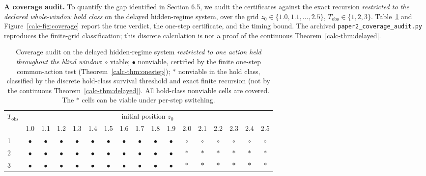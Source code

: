\documentclass[10pt,twocolumn]{article}
\theoremstyle{definition}
\begin{document}
\textbf{A coverage audit.} To quantify the gap identified in Section 6.5, we audit the certificates against the exact recursion \emph{restricted to the declared whole-window hold class} on the delayed hidden-regime system, over the grid \(z_{0} \in \{1.0, 1.1, \dots, 2.5\}\), \(T_{\mathrm{obs}} \in \{1,2,3\}\). Table~\ref{calc-tab:coverage} and Figure~\ref{calc-fig:coverage} report the true verdict, the one-step certificate, and the timing bound. The archived \texttt{paper2\_coverage\_audit.py} reproduces the
finite-grid classification; this discrete calculation is not a proof of
the continuous Theorem~\ref{calc-thm:delayed}.

\begin{table}[t]
\centering
\footnotesize
\begin{tabular}{@{}lcccccccccccccccc@{}}
\toprule
\(T_{\mathrm{obs}}\) & \multicolumn{16}{c}{initial position \(z_{0}\)} \\
\cmidrule(lr){2-17}
 & 1.0 & 1.1 & 1.2 & 1.3 & 1.4 & 1.5 & 1.6 & 1.7 & 1.8 & 1.9 & 2.0 & 2.1 & 2.2 & 2.3 & 2.4 & 2.5 \\
\midrule
1 & \(\bullet\) & \(\bullet\) & \(\bullet\) & \(\bullet\) & \(\bullet\) & \(\bullet\) & \(\bullet\) & \(\bullet\) & \(\bullet\) & \(\bullet\) & \(\circ\) & \(\circ\) & \(\circ\) & \(\circ\) & \(\circ\) & \(\circ\) \\
2 & \(\bullet\) & \(\bullet\) & \(\bullet\) & \(\bullet\) & \(\bullet\) & \(\bullet\) & \(\bullet\) & \(\bullet\) & \(\bullet\) & \(\bullet\) & \(\ast\) & \(\ast\) & \(\ast\) & \(\ast\) & \(\ast\) & \(\ast\) \\
3 & \(\bullet\) & \(\bullet\) & \(\bullet\) & \(\bullet\) & \(\bullet\) & \(\bullet\) & \(\bullet\) & \(\bullet\) & \(\bullet\) & \(\bullet\) & \(\ast\) & \(\ast\) & \(\ast\) & \(\ast\) & \(\ast\) & \(\ast\) \\
\bottomrule
\end{tabular}
\caption{Coverage audit on the delayed hidden-regime system \emph{restricted to one action held throughout the blind window}: \(\circ\) viable; \(\bullet\) nonviable, certified by the finite one-step common-action test (Theorem~\ref{calc-thm:onestep}); \(\ast\) nonviable in the hold class, classified by the discrete hold-class survival threshold and exact finite recursion (not by the continuous Theorem~\ref{calc-thm:delayed}). All hold-class nonviable cells are covered. The \(\ast\) cells can be viable under per-step switching.}
\label{calc-tab:coverage}
\end{table}
\end{document}
